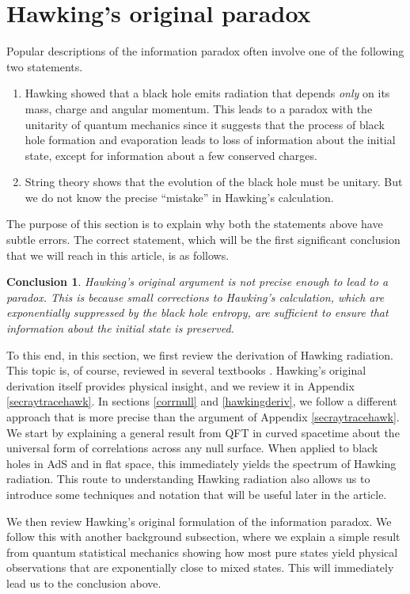 \documentclass[12pt]{article}
\newtheorem{lesson}{Conclusion}
\begin{document}
\section{Hawking's original paradox \label{secoldinfo}}
Popular descriptions of the information paradox often involve one of the following two statements.
\begin{enumerate}
\item[1.]
Hawking showed that a black hole emits radiation that depends {\em only} on its mass, charge and angular momentum.  This leads to a paradox with the unitarity of quantum mechanics since it suggests that the process of black hole formation and evaporation leads to loss of  information about the initial state, except for information about a few conserved charges.
\item[2.]
String theory shows that the evolution of the black hole must be unitary. But we do not know the precise ``mistake'' in Hawking's calculation.
\end{enumerate}
The purpose of this section is to explain why both the statements above have subtle errors. The correct statement, which will be the first significant conclusion that we will reach in this article, is as follows.
\begin{lesson}
\label{lessonone}
Hawking's original argument is not precise enough to lead to a paradox. This is because small corrections to Hawking's calculation, which are exponentially suppressed by the black hole entropy, are sufficient to ensure that information about the initial state is preserved.  \end{lesson}

To this end, in this section, we first review the derivation of Hawking radiation. This topic is, of course, reviewed in several textbooks \cite{birrell1984quantum,wald1994quantum}. Hawking's original derivation itself provides physical insight, and we review it in Appendix \ref{secraytracehawk}. In sections \ref{corrnull} and \ref{hawkingderiv},  we follow a different approach that  is more precise than the argument of Appendix \ref{secraytracehawk}.  We start by explaining a general result from QFT in curved spacetime about the universal form of correlations across any null surface. When applied to black holes in AdS and in flat space, this immediately yields the spectrum of Hawking radiation. This route to understanding Hawking radiation also allows us to introduce some techniques and notation that will be useful later in the article.

We then review Hawking's original formulation of the information paradox. We follow this with another background subsection, where we explain a simple result from quantum statistical mechanics showing how most pure states yield physical observations that are exponentially close to mixed states. This will immediately lead us to the conclusion above.
\end{document}
